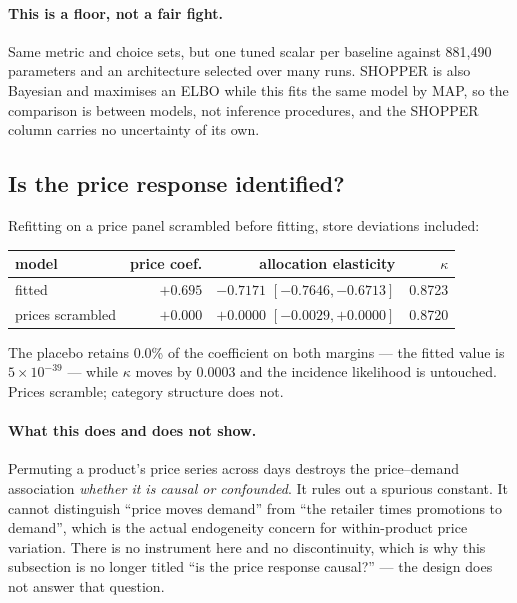 \documentclass[11pt]{article}
\begin{document}
\paragraph{This is a floor, not a fair fight.} Same metric and choice sets, but one tuned
scalar per baseline against 881{,}490 parameters and an architecture selected over many
runs. SHOPPER is also Bayesian and maximises an ELBO while this fits the same model by MAP,
so the comparison is between models, not inference procedures, and the SHOPPER column
carries no uncertainty of its own.

\subsection{Is the price response identified?}
\label{sec:causal}

Refitting on a price panel scrambled before fitting, store deviations included:

\begin{center}
\begin{tabular}{lrrr}
\toprule
model & price coef. & allocation elasticity & $\kappa$ \\
\midrule
fitted & $+0.695$ & $-0.7171$ $[-0.7646,-0.6713]$ & 0.8723 \\
prices scrambled & $\mathbf{+0.000}$ & $\mathbf{+0.0000}$ $[-0.0029,+0.0000]$ & 0.8720 \\
\bottomrule
\end{tabular}
\end{center}

The placebo retains 0.0\% of the coefficient on both margins --- the fitted value is
$5\times10^{-39}$ --- while $\kappa$ moves by $0.0003$ and the incidence likelihood is
untouched. Prices scramble; category structure does not.

\paragraph{What this does and does not show.} Permuting a product's price series across days
destroys the price--demand association \emph{whether it is causal or confounded}. It rules
out a spurious constant. It cannot distinguish ``price moves demand'' from ``the retailer
times promotions to demand'', which is the actual endogeneity concern for within-product
price variation. There is no instrument here and no discontinuity, which is why this
subsection is no longer titled ``is the price response causal?'' --- the design does not
answer that question.
\end{document}
